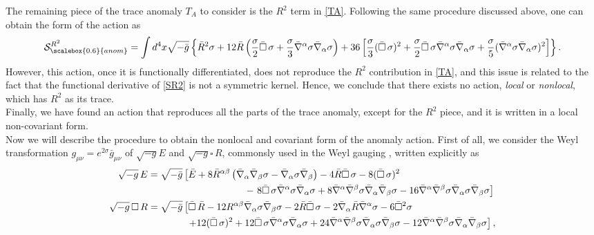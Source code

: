 \documentclass[a4paper,11pt,openright,twoside]{book}
\let\a=\alpha   \let\b=\beta   \let\g=\gamma   \let\d=\delta
\let\s=\sigma  \let\t=\tau     \let\u=\upsilon \let\f=\phi
\numberwithin{equation}{section}
\begin{document}
{{{{	The remaining piece of the trace anomaly $T_A$ to consider is the $R^2$ term in \eqref{TA}. Following the same procedure discussed above, one can obtain the form of the action as
	\begin{equation}
		\mathcal{S}_{\scalebox{0.6}{anom}}^{R^2}=\int d^4 x\sqrt{-\bar g}\left\{\bar R^2\s+12\bar R\left(\frac{\s}{2}\bar\square\,\s+\frac{\s}{3}\bar\nabla^\a\s\bar\nabla_\a\s\right)+36\left[\frac{\s}{3}(\bar\square\,\s)^2+\frac{\s}{2}\bar\square\,\s\bar\nabla^\a\s\bar\nabla_\a\s+\frac{\s}{5}(\bar\nabla^\a\s\bar\nabla_\a\s)^2\right]\right\}.\label{SR2}
	\end{equation}
	However, this action, once it is functionally differentiated, does not reproduce the $R^2$ contribution in \eqref{TA}, and this issue is related to the fact that the functional derivative of \eqref{SR2} is not a symmetric kernel. Hence, we conclude that there exists no action, \emph{local} or \emph{nonlocal}, which has $R^2$ as its trace.\\
	Finally, we have found an action that reproduces all the parts of the trace anomaly, except for the $R^2$ piece, and it is written in a local non-covariant form. \\
	Now we will describe the procedure to obtain the nonlocal and covariant form of the anomaly action. 
	First of all, we consider the Weyl transformation $g_{\mu\nu}=e^{2\s}\bar g_{\mu\nu}$ of $\sqrt{-g} E$ and $\sqrt{-g} \square\, R$, commonsly used in the Weyl gauging 
	\cite{Coriano:2013nja,Codello:2012sn}\cite{Coriano:2013xua}, written explicitly as
	\begin{align}
		\sqrt{-g}\,E&=\sqrt{-\bar g}\left[\bar E+8\bar R^{\a\b}\left(\bar\nabla_\a\bar\nabla_\b\s-\bar\nabla_\a\s\bar\nabla_\b\right)-4\bar R\bar\square\,\s-8(\bar\square\,\s)^2\right.\notag\\
		&\qquad\qquad\qquad\qquad\qquad-\left.8\bar\square\,\s\bar\nabla^\a\s\bar\nabla_\a\s+8\bar\nabla^\a\bar\nabla^\b\s\bar\nabla_\a\bar\nabla_\b\s-16\bar\nabla^\a\bar\nabla^\b\s\bar\nabla_\a\s\bar\nabla_\b\s\right]\label{E1}\\
		\sqrt{-g}\,\square\, R&=\sqrt{-\bar g}\left[\bar\square\,\bar R-12R^{\a\b}\bar\nabla_\a\s\bar\nabla_\b\s-2
		\bar R\bar\square\,\s-2\bar\nabla_\a\bar R\bar\nabla^\a\s-6\bar\square^2\s\right.\notag\\
		&\left.\qquad\qquad +12(\bar\square\,\s)^2+12\bar\square\,\s\bar\nabla^\a\s\bar\nabla_\a\s+24\bar\nabla^\a\bar\nabla^\b\s\bar\nabla_\a\s\bar\nabla_\b\s-12\bar\nabla^\a\bar\nabla^\b\s\bar\nabla_\a\bar\nabla_\b\s\right]\label{R1},

\end{align}}}}}
\end{document}
